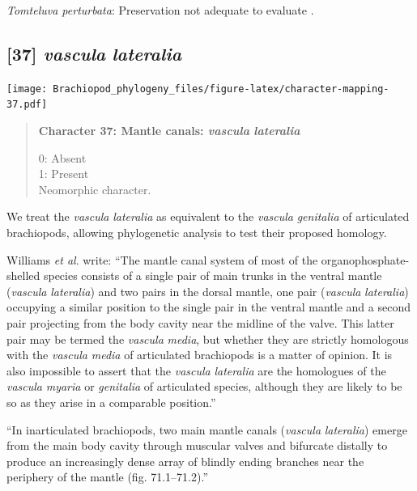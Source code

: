 \documentclass[openany]{book}
\begin{document}
\hypertarget{Tomteluva_perturbata-coding-36}{}
\emph{Tomteluva perturbata}: Preservation not adequate to evaluate
\citep{Streng2016Anew}.

\subsection*{\texorpdfstring{{[}37{]} \emph{vascula}
\emph{lateralia}}{{[}37{]} vascula lateralia}}\label{vascula-lateralia}

\texttt{[image: Brachiopod\_phylogeny\_files/figure-latex/character-mapping-37.pdf]}

\begin{quote}
\textbf{Character 37: Mantle canals: \emph{vascula} \emph{lateralia}}

0: Absent\\
1: Present\\
Neomorphic character.
\end{quote}

We treat the \emph{vascula} \emph{lateralia} as equivalent to the
\emph{vascula} \emph{genitalia} of articulated brachiopods, allowing
phylogenetic analysis to test their proposed homology.

Williams \emph{et al}. \citeyearpar{Williams1997Introduction} write:
``The mantle canal system of most of the organophosphate-shelled species
consists of a single pair of main trunks in the ventral mantle
(\emph{vascula} \emph{lateralia}) and two pairs in the dorsal mantle,
one pair (\emph{vascula} \emph{lateralia}) occupying a similar position
to the single pair in the ventral mantle and a second pair projecting
from the body cavity near the midline of the valve. This latter pair may
be termed the \emph{vascula} \emph{media}, but whether they are strictly
homologous with the \emph{vascula} \emph{media} of articulated
brachiopods is a matter of opinion. It is also impossible to assert that
the \emph{vascula} \emph{lateralia} are the homologues of the
\emph{vascula} \emph{myaria} or \emph{genitalia} of articulated species,
although they are likely to be so as they arise in a comparable
position.''

``In inarticulated brachiopods, two main mantle canals (\emph{vascula}
\emph{lateralia}) emerge from the main body cavity through muscular
valves and bifurcate distally to produce an increasingly dense array of
blindly ending branches near the periphery of the mantle (fig.
71.1--71.2).''
\end{document}

